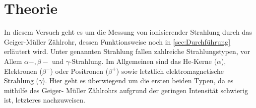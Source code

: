\section{Theorie}
\label{sec:Theorie}

In diesem Versuch geht es um die Messung von ionisierender Strahlung durch 
das Geiger-Müller Zählrohr, dessen Funktionsweise noch in \autoref{sec:Durchführung}
erläutert wird. Unter genannten Strahlung fallen zahlreiche
Strahlungstypen, vor Allem $\alpha-, \beta-$ und $\gamma$-Strahlung. Im 
Allgemeinen sind das He-Kerne ($\alpha$), Elektronen ($\beta^-$) oder Positronen
($\beta^+$) sowie letztlich elektromagnetische Strahlung ($\gamma$). Hier geht
es überwiegend um die ersten beiden Typen, da es mithilfe des Geiger-
Müller Zählrohrs aufgrund der geringen Intensität schwierig ist, letzteres
nachzuweisen.